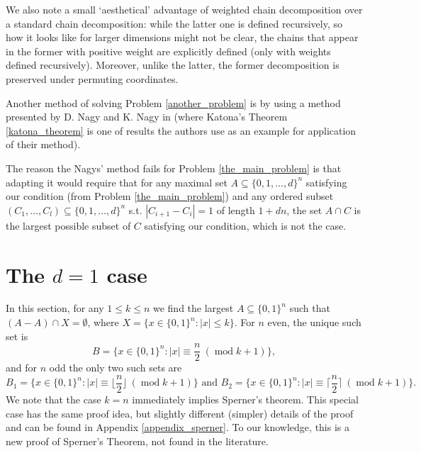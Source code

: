 \documentclass[11pt, reqno]{amsart}
\numberwithin{equation}{section}
\newcommand\modd{\operatorname{mod}}
\begin{document}
We also note a small `aesthetical' advantage of weighted chain decomposition over a standard chain decomposition: while the latter one is defined recursively, so how it looks like for larger dimensions might not be clear, the chains that appear in the former with positive weight are explicitly defined (only with weights defined recursively). Moreover, unlike the latter, the former decomposition is preserved under permuting coordinates.

Another method of solving Problem \ref{another_problem} is by using a method presented by D. Nagy and K. Nagy in \cite{nagys} (where Katona's Theorem \ref{katona_theorem} is one of results the authors use as an example for application of their method).

The reason the Nagys' method fails for Problem \ref{the_main_problem} is that adapting it would require that for any maximal set $A \subseteq \{0, 1, \dots, d\}^n$ satisfying our condition (from Problem \ref{the_main_problem}) and any ordered subset $(C_1, \dots, C_l) \subseteq \{0, 1, \dots, d\}^n$ s.t. $|C_{i+1}-C_i|=1$ of length $1+dn$, the set $A \cap C$ is the largest possible subset of $C$ satisfying our condition, which is not the case.

\section{The \texorpdfstring{$d=1$}{d=1} case}
\label{section_d1}

In this section, for any $1 \leqslant k \leqslant n$ we find the largest $A \subseteq \{0, 1\}^n$ such that $(A-A) \cap X = \emptyset$, where $X=\Big\{x \in \{0, 1\}^n: |x| \leqslant k\Big\}$. For $n$ even, the unique such set is
\begin{equation}
\label{b_definition}
    B = \Big\{ x \in \{0, 1\}^n: |x| \equiv \frac{n}{2} \ (\modd k+1) \Big\},
\end{equation}
and for $n$ odd the only two such sets are
\begin{equation}
    B_1 = \Big\{ x \in \{0, 1\}^n: |x| \equiv \Big\lfloor \frac{n}{2} \Big\rfloor \ (\modd k+1) \Big\} \text{  and  } B_2 = \Big\{ x \in \{0, 1\}^n: |x| \equiv \Big\lceil \frac{n}{2} \Big\rceil \ (\modd k+1) \Big\}.
\end{equation}
We note that the case $k=n$ immediately implies Sperner's theorem. This special case has the same proof idea, but slightly different (simpler) details of the proof and can be found in Appendix \ref{appendix_sperner}. To our knowledge, this is a new proof of Sperner's Theorem, not found in the literature.
\end{document}
